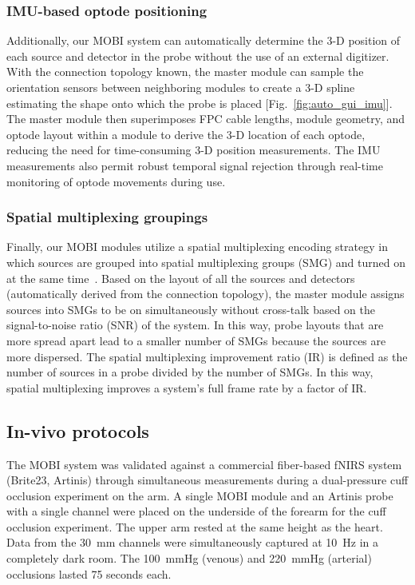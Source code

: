 \subsubsection{IMU-based optode positioning}
Additionally, our MOBI system can automatically determine the 3-D position of each source and detector in the probe without the use of an external digitizer. With the connection topology known, the master module can sample the orientation sensors between neighboring modules to create a 3-D spline estimating the shape onto which the probe is placed [Fig.~\ref{fig:auto_gui_imu}]. The master module then superimposes FPC cable lengths, module geometry, and optode layout within a module to derive the 3-D location of each optode, reducing the need for time-consuming 3-D position measurements. The IMU measurements also permit robust temporal signal rejection through real-time monitoring of optode movements during use. 

\subsubsection{Spatial multiplexing groupings}
Finally, our MOBI modules utilize a spatial multiplexing encoding strategy in which sources are grouped into spatial multiplexing groups (SMG) and turned on at the same time~\cite{Vanegas2022}. Based on the layout of all the sources and detectors (automatically derived from the connection topology), the master module assigns sources into SMGs to be on simultaneously without cross-talk based on the signal-to-noise ratio (SNR) of the system. In this way, probe layouts that are more spread apart lead to a smaller number of SMGs because the sources are more dispersed. The spatial multiplexing improvement ratio (IR) is defined as the number of sources in a probe divided by the number of SMGs. In this way, spatial multiplexing improves a system's full frame rate by a factor of IR. 

\subsection{In-vivo protocols}
The MOBI system was validated against a commercial fiber-based fNIRS system (Brite23, Artinis) through simultaneous measurements during a dual-pressure cuff occlusion experiment on the arm. A single MOBI module and an Artinis probe with a single channel were placed on the underside of the forearm for the cuff occlusion experiment. The upper arm rested at the same height as the heart. Data from the 30~mm channels were simultaneously captured at 10~Hz in a completely dark room. The 100~mmHg (venous) and 220~mmHg (arterial) occlusions lasted 75 seconds each. 


